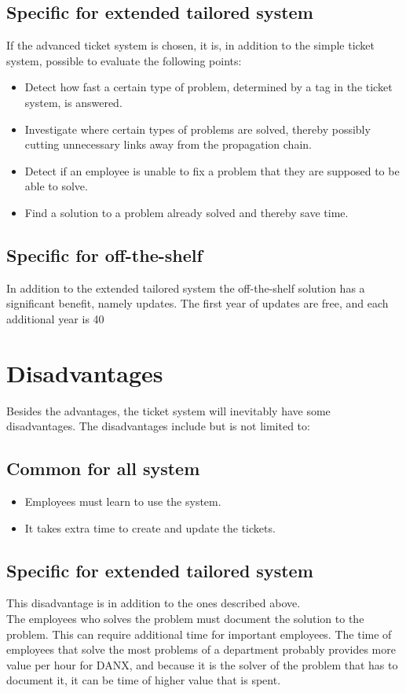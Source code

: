 \subsection{Specific for extended tailored system}
If the advanced ticket system is chosen, it is, in addition to the simple ticket system, possible to evaluate the following points:
\begin{itemize}
	\item Detect how fast a certain type of problem, determined by a tag in the ticket system, is answered.
\item Investigate where certain types of problems are solved, thereby possibly cutting unnecessary links away from the propagation chain.
\item Detect if an employee is unable to fix a problem that they are supposed to be able to solve.
\item Find a solution to a problem already solved and thereby save time.
\end{itemize}

\subsection{Specific for off-the-shelf}
In addition to the extended tailored system the off-the-shelf solution has a significant benefit, namely updates. The first year of updates are free, and each additional year is 40%

\section{Disadvantages}
Besides the advantages, the ticket system will inevitably have some disadvantages. The disadvantages include but is not limited to:

\subsection{Common for all system}
\begin{itemize}
	\item Employees must learn to use the system.
	\item It takes extra time to create and update the tickets.
\end{itemize}

\subsection{Specific for extended tailored system}
This disadvantage is in addition to the ones described above.\\
The employees who solves the problem must document the solution to the problem. This can require additional time for important employees. The time of employees that solve the most problems of a department probably provides more value per hour for DANX, and because it is the solver of the problem that has to document it, it can be time of higher value that is spent.


